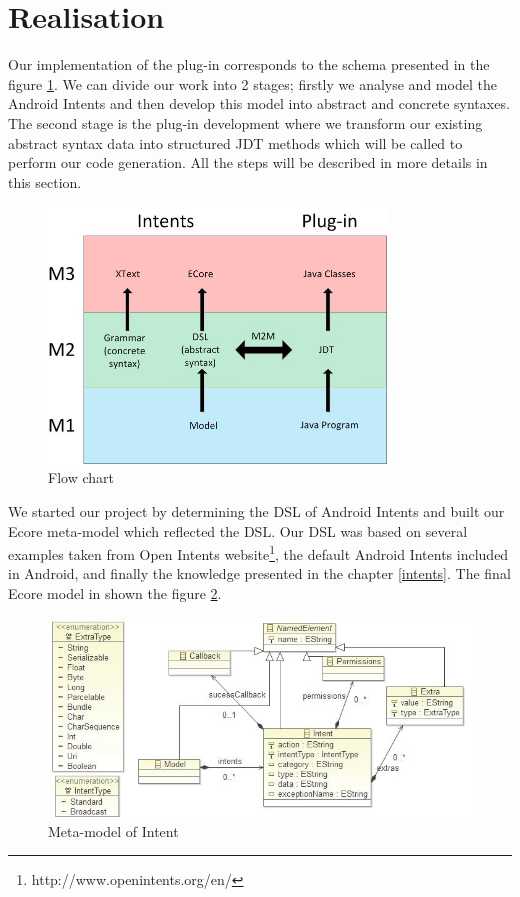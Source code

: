 \section{Realisation}
\label{realisation}

Our implementation of the plug-in corresponds to the schema presented in the figure \ref{flowchart}. We can divide our work into 2 stages; firstly we analyse and model the Android Intents and then develop this model into abstract and concrete syntaxes. The second stage is the plug-in development where we transform our existing abstract syntax data into structured JDT methods which will be called to perform our code generation. All the steps will be described in more details in this section.  

\begin{figure}[H]
\label{flowchart}
  \centering
    \includegraphics[width=0.8\textwidth]{flowchart}
  \caption{Flow chart}
\end{figure}

We started our project by determining the DSL of Android Intents and built our Ecore meta-model which reflected the DSL. Our DSL was based on several examples taken from Open Intents website\footnote{http://www.openintents.org/en/}, the default Android Intents included in Android, and finally the knowledge presented in the chapter \ref{intents}. The final Ecore model in shown the figure \ref{meta-model}.

\begin{figure}[H]
\label{meta-model}
  \centering
    \includegraphics[width=\textwidth]{metamodel}
  \caption{Meta-model of Intent}
\end{figure}

